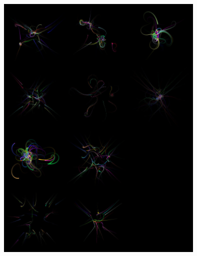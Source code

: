 \documentclass[12pt, a4paper]{article}
\begin{document}
\begin{center}
\begin{figure}[H]
\centering\includegraphics[width=10cm]{./fireflower.jpg}\\
\end{figure}
\end{center}
\end{document}
